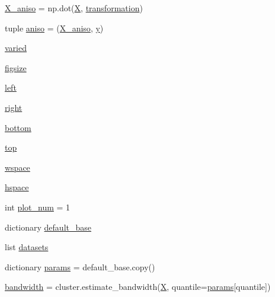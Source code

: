\begin{DoxyCompactItemize}
\item 
\hyperlink{namespaceplot__cluster__comparison_a4bce070b36506c646cb5b702fc953298}{X\+\_\+aniso} = np.\+dot(\hyperlink{namespaceplot__cluster__comparison_a92f18e1b0bff540575ef5295ce60adef}{X}, \hyperlink{namespaceplot__cluster__comparison_accd21aa8de30bfc3ba79b3a384a05a6e}{transformation})
\item 
tuple \hyperlink{namespaceplot__cluster__comparison_a164bf5ca336400f3ed6eb956b9d04552}{aniso} = (\hyperlink{namespaceplot__cluster__comparison_a4bce070b36506c646cb5b702fc953298}{X\+\_\+aniso}, \hyperlink{namespaceplot__cluster__comparison_a4341eac9f6e009470760b4e123c2acad}{y})
\item 
\hyperlink{namespaceplot__cluster__comparison_a25773486b8df3fde9e17bca039afecb1}{varied}
\item 
\hyperlink{namespaceplot__cluster__comparison_adc55aa0f44e59e0f3471833db6f25b08}{figsize}
\item 
\hyperlink{namespaceplot__cluster__comparison_a2964c1a5d36124d8d65b9086403183cb}{left}
\item 
\hyperlink{namespaceplot__cluster__comparison_a8a02f4b67ada3f0ec59dbea12416c7bb}{right}
\item 
\hyperlink{namespaceplot__cluster__comparison_a3c60195300c16ce76b96e6376a0b8654}{bottom}
\item 
\hyperlink{namespaceplot__cluster__comparison_aa76c76b89da557e22c27048541f77c80}{top}
\item 
\hyperlink{namespaceplot__cluster__comparison_af7c99d4267ffefc921a644fe6ef64c3b}{wspace}
\item 
\hyperlink{namespaceplot__cluster__comparison_a645aac958e0ab94d33d30fefaff93e6f}{hspace}
\item 
int \hyperlink{namespaceplot__cluster__comparison_a4dd5866fcfb5665cc1aa3406261b692e}{plot\+\_\+num} = 1
\item 
dictionary \hyperlink{namespaceplot__cluster__comparison_aea1f3ae4fe0c1512de085b8bec71998c}{default\+\_\+base}
\item 
list \hyperlink{namespaceplot__cluster__comparison_ade09451b956b38726a4e858a0338df63}{datasets}
\item 
dictionary \hyperlink{namespaceplot__cluster__comparison_a5afe27ff875351ace28865d50f61c56a}{params} = default\+\_\+base.\+copy()
\item 
\hyperlink{namespaceplot__cluster__comparison_a3628421ec7ed08e955e49826b638402b}{bandwidth} = cluster.\+estimate\+\_\+bandwidth(\hyperlink{namespaceplot__cluster__comparison_a92f18e1b0bff540575ef5295ce60adef}{X}, quantile=\hyperlink{namespaceplot__cluster__comparison_a5afe27ff875351ace28865d50f61c56a}{params}\mbox{[}\textquotesingle{}quantile\textquotesingle{}\mbox{]})

\end{DoxyCompactItemize}
